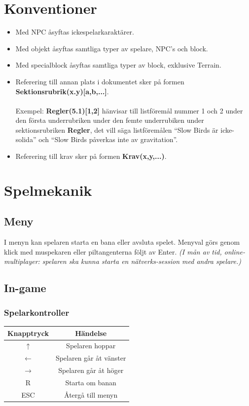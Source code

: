 \documentclass{TDP003mall}
\begin{document}
\section{Konventioner}
\begin{itemize}
\item Med NPC åsyftas ickespelarkaraktärer.
\item Med objekt åsyftas samtliga typer av spelare, NPC's och block.
\item Med specialblock åsyftas samtliga typer av block, exklusive Terrain.
\item Referering till annan plats i dokumentet sker på formen \textbf{Sektionsrubrik(x.y)[a,b,...]}.
\\\\
Exempel: \textbf{Regler(5.1)[1,2]} hänvisar till listföremål nummer 1 och 2 under den första underrubriken under den femte underrubiken under sektionsrubriken \textbf{Regler}, det vill säga listföremålen ``Slow Birds är icke-solida'' och ``Slow Birds påverkas inte av gravitation''.
\item Referering till krav sker på formen \textbf{Krav(x,y,...)}.
\end{itemize}

\newpage

\section{Spelmekanik}
\subsection{Meny}
I menyn kan spelaren starta en bana eller avsluta spelet. Menyval görs genom klick med muspekaren eller piltangenterna följt av Enter. \textit{(I mån av tid, online-multiplayer: spelaren ska kunna starta en nätverks-session med andra spelare.)}

\subsection{In-game}

\subsubsection{Spelarkontroller}
\begin{tabular}{|c|c|}
\hline
\textbf{Knapptryck} & \textbf{Händelse} \\\hline
$\uparrow$ & Spelaren hoppar \\\hline
$\leftarrow$ & Spelaren går åt vänster \\\hline
$\rightarrow$ & Spelaren går åt höger \\\hline
R & Starta om banan \\\hline
ESC & Återgå till menyn \\\hline
\end{tabular}
\end{document}
